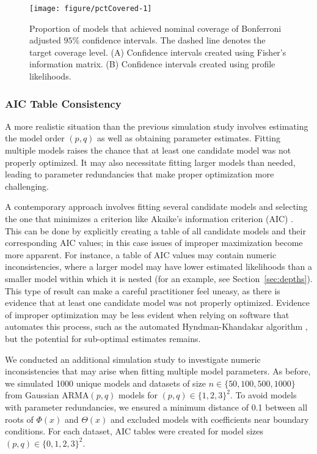 \begin{figure}[!ht]
\begin{knitrout}
\color{fgcolor}

{\centering \texttt{[image: figure/pctCovered-1]} 

}


\end{knitrout}
\caption{\label{fig:pctCovered}Proportion of models that achieved nominal coverage of Bonferroni adjusted $95\%$ confidence intervals. The dashed line denotes the target coverage level. (A) Confidence intervals created using Fisher's information matrix. (B) Confidence intervals created using profile likelihoods.}
\end{figure}

\subsubsection{AIC Table Consistency}

A more realistic situation than the previous simulation study involves estimating the model order $(p, q)$ as well as obtaining parameter estimates.
Fitting multiple models raises the chance that at least one candidate model was not properly optimized.
It may also necessitate fitting larger models than needed, leading to parameter redundancies that make proper optimization more challenging.

A contemporary approach involves fitting several candidate models and selecting the one that minimizes a criterion like Akaike's information criterion (AIC) \cite{aic74}. 
This can be done by explicitly creating a table of all candidate models and their corresponding AIC values;
in this case issues of improper maximization become more apparent.
For instance, a table of AIC values may contain numeric inconsistencies, where a larger model may have lower estimated likelihoods than a smaller model within which it is nested (for an example, see Section~\ref{sec:depths}).
This type of result can make a careful practitioner feel uneasy, as there is evidence that at least one candidate model was not properly optimized.
Evidence of improper optimization may be less evident when relying on software that automates this process, such as the automated Hyndman-Khandakar algorithm \cite{hyndman08}, but the potential for sub-optimal estimates remains.



We conducted an additional simulation study to investigate numeric inconsistencies that may arise when fitting multiple model parameters.
As before, we simulated 1000 unique models and datasets of size $n \in \{50, 100, 500, 1000\}$ from Gaussian ARMA$(p, q)$ models for $(p, q) \in \{1, 2, 3\}^2$.
To avoid models with parameter redundancies, we ensured a minimum distance of 0.1 between all roots of $\Phi(x)$ and $\Theta(x)$ and excluded models with coefficients near boundary conditions.
For each dataset, AIC tables were created for model sizes $(p, q) \in \{0, 1, 2, 3\}^2$.

